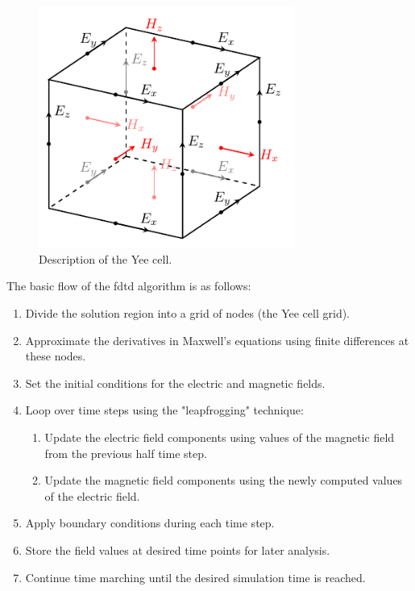 \begin{figure}[H]\label{fig:yee}
  \centering
  \includegraphics[width=0.75\textwidth]{figures/yee.pdf}
  \caption{Description of the Yee cell.}
\end{figure}

The basic flow of the \gls{fdtd} algorithm is as follows:
\begin{enumerate}
\item Divide the solution region into a grid of nodes (the Yee cell grid).
\item Approximate the derivatives in Maxwell's equations using finite differences at these nodes.
\item Set the initial conditions for the electric and magnetic fields.
\item Loop over time steps using the "leapfrogging" technique:
\begin{enumerate}
  \item Update the electric field components using values of the magnetic field from the previous half time step.
  \item Update the magnetic field components using the newly computed values of the electric field.
\end{enumerate}
\item Apply boundary conditions during each time step.
\item Store the field values at desired time points for later analysis.
\item Continue time marching until the desired simulation time is reached.
\end{enumerate}



